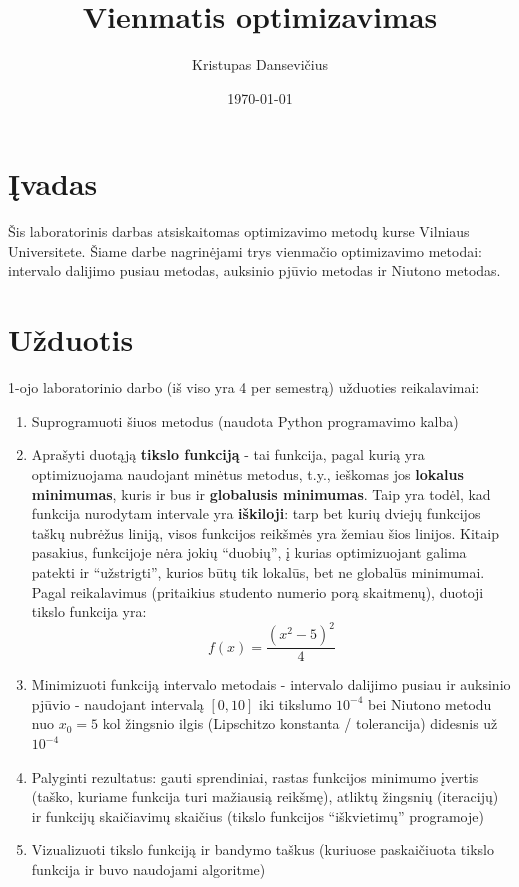 \documentclass[lithuanian,a4paper,12pt]{article}
\title{Vienmatis optimizavimas}
\author{Kristupas Dansevičius}
\date{\today}
\begin{document}
\maketitle
\tableofcontents

\section{Įvadas}
Šis laboratorinis darbas atsiskaitomas optimizavimo metodų kurse Vilniaus Universitete. 
Šiame darbe nagrinėjami trys vienmačio optimizavimo metodai:
intervalo dalijimo pusiau metodas, auksinio pjūvio metodas ir Niutono metodas. 

\section{Užduotis}
1-ojo laboratorinio darbo (iš viso yra 4 per semestrą) užduoties reikalavimai:
\begin{enumerate}
    \item Suprogramuoti šiuos metodus (naudota Python programavimo kalba)
    \item Aprašyti duotąją \textbf{tikslo funkciją} - tai funkcija, pagal kurią yra optimizuojama naudojant minėtus metodus, t.y., ieškomas jos \textbf{lokalus minimumas}, kuris ir bus ir \textbf{globalusis minimumas}. Taip yra todėl, kad funkcija nurodytam intervale yra \textbf{iškiloji}: tarp bet kurių dviejų funkcijos taškų nubrėžus liniją, visos funkcijos reikšmės yra žemiau šios linijos. Kitaip pasakius, funkcijoje nėra jokių ``duobių'', į kurias optimizuojant galima patekti ir ``užstrigti'', kurios būtų tik lokalūs, bet ne globalūs minimumai. Pagal reikalavimus (pritaikius studento numerio porą skaitmenų), duotoji tikslo funkcija yra:
        \begin{equation*}
            f(x) = \frac{(x^2 - 5)^2}{4}
        \end{equation*}
    \item Minimizuoti funkciją intervalo metodais - intervalo dalijimo pusiau ir auksinio pjūvio - naudojant intervalą $[0,10]$ iki tikslumo $10^{-4}$ bei Niutono metodu nuo $x_0 = 5$ kol žingsnio ilgis (Lipschitzo konstanta / tolerancija) didesnis už $10^{-4}$
    \item Palyginti rezultatus: gauti sprendiniai, rastas funkcijos minimumo įvertis (taško, kuriame funkcija turi mažiausią reikšmę), atliktų žingsnių (iteracijų) ir funkcijų skaičiavimų skaičius (tikslo funkcijos ``iškvietimų'' programoje)
    \item Vizualizuoti tikslo funkciją ir bandymo taškus (kuriuose paskaičiuota tikslo funkcija ir buvo naudojami algoritme)
\end{enumerate}
\end{document}
